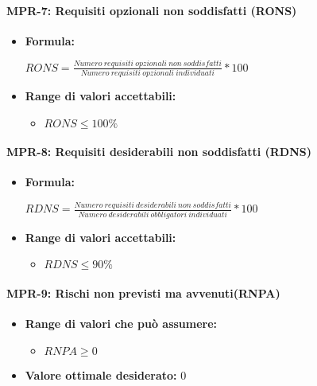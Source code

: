 \paragraph{MPR-7: Requisiti opzionali non soddisfatti (RONS)}
\begin{itemize}
    \item \textbf{Formula:}
          \begin{center}
              \(RONS=\frac{Numero\ requisiti\ opzionali\ non\ soddisfatti}{Numero\ requisiti\  opzionali\ individuati}*100\)
          \end{center}
    \item \textbf{Range di valori accettabili:}
          \begin{itemize}
              \item $RONS \leq 100\%$
          \end{itemize}
\end{itemize}

\paragraph{MPR-8: Requisiti desiderabili non soddisfatti (RDNS)}
\begin{itemize}

    \item \textbf{Formula:}
          \begin{center}
              \(RDNS=\frac{Numero\ requisiti\ desiderabili\ non\ soddisfatti}{Numero\ desiderabili\  obbligatori\ individuati}*100\)
          \end{center}
    \item \textbf{Range di valori accettabili:}
          \begin{itemize}
              \item $RDNS \leq 90\%$
          \end{itemize}
\end{itemize}

\paragraph{MPR-9: Rischi non previsti ma avvenuti(RNPA)}
\begin{itemize}
    \item \textbf{Range di valori che può assumere:}
          \begin{itemize}
              \item  $RNPA \geq 0$
          \end{itemize}
    \item \textbf{Valore ottimale desiderato:} 0
\end{itemize}

